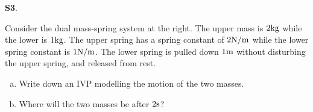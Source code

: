 \documentclass{article}
\newenvironment{problem}[1]
{
  \begin{flushleft}
  \textbf{#1}.
  \ignorespaces
}
{
  \end{flushleft}
}
\begin{document}
\begin{problem}{S3}
\begin{minipage}[t]{0.8\linewidth}
Consider the dual mass-spring system at the right.  The upper mass is \(2 {\rm kg}\) while the lower is \(1 {\rm kg}\).  The upper spring has a spring constant of \( 2 {\rm N/m}\) while the lower spring constant is \(1 {\rm N/m}\).  The lower spring is pulled down \(1 {\rm m}\) without disturbing the upper spring, and released from rest. 
\begin{enumerate}[(a)]
\item Write down an IVP modelling the motion of the two masses.
\item Where will the two masses be after \(2 {\rm s}\)?
\end{enumerate}
\end{minipage}
\hfill
\springdoublemassQuiz[0.7]
\hfill
\end{problem}
\end{document}
